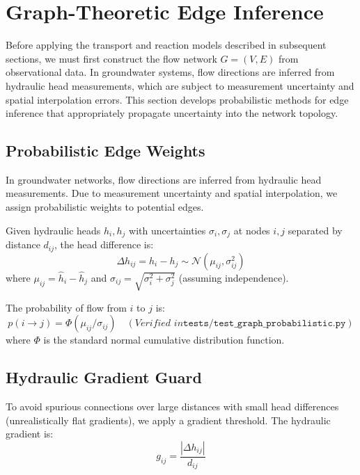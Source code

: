 \documentclass[12pt,a4paper]{article}
\theoremstyle{plain}
\theoremstyle{definition}
\theoremstyle{remark}
\begin{document}
\section{Graph-Theoretic Edge Inference}\label{sec:graph}

Before applying the transport and reaction models described in subsequent sections, we must first construct the flow network $G = (V, E)$ from observational data. In groundwater systems, flow directions are inferred from hydraulic head measurements, which are subject to measurement uncertainty and spatial interpolation errors. This section develops probabilistic methods for edge inference that appropriately propagate uncertainty into the network topology.

\subsection{Probabilistic Edge Weights}

In groundwater networks, flow directions are inferred from hydraulic head measurements. Due to measurement uncertainty and spatial interpolation, we assign probabilistic weights to potential edges.

Given hydraulic heads $h_i, h_j$ with uncertainties $\sigma_i, \sigma_j$ at nodes $i, j$ separated by distance $d_{ij}$, the head difference is:
\begin{equation}
	\Delta h_{ij} = h_i - h_j \sim \mathcal{N}(\mu_{ij}, \sigma_{ij}^2)
\end{equation}
where $\mu_{ij} = \hat{h}_i - \hat{h}_j$ and $\sigma_{ij} = \sqrt{\sigma_i^2 + \sigma_j^2}$ (assuming independence).

The probability of flow from $i$ to $j$ is:
\begin{equation}\label{eq:edge_probability}
	p(i \to j) = \Phi(\mu_{ij} / \sigma_{ij}) \quad (\textit{Verified in} \texttt{tests/test\_graph\_probabilistic.py})
\end{equation}
where $\Phi$ is the standard normal cumulative distribution function.

\subsection{Hydraulic Gradient Guard}

To avoid spurious connections over large distances with small head differences (unrealistically flat gradients), we apply a gradient threshold. The hydraulic gradient is:
\begin{equation}
	g_{ij} = \frac{|\Delta h_{ij}|}{d_{ij}}
\end{equation}
\end{document}
